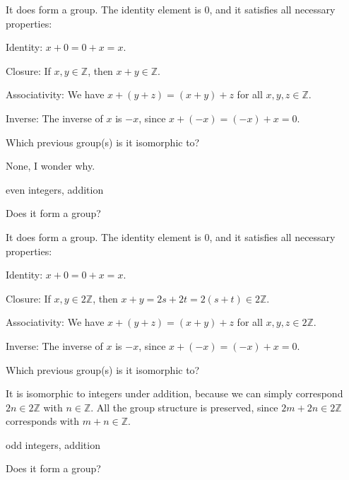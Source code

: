 \documentclass[../gatm_answers.tex]{subfiles}
\begin{document}
It does form a group. The identity element is $0$, and it satisfies all necessary properties:

Identity: $x+0=0+x=x$.

Closure: If $x,y\in \mathbb{Z}$, then $x+y\in\mathbb{Z}$.

Associativity: We have $x+(y+z)=(x+y)+z$ for all $x,y,z\in\mathbb{Z}$.

Inverse: The inverse of $x$ is $-x$, since $x+(-x)=(-x)+x=0$.

\begin{iinner_problem}
\item Which previous group(s) is it isomorphic to?
\end{iinner_problem}

None, I wonder why.

\begin{inner_problem}
\item even integers, addition
\end{inner_problem}

\begin{iinner_problem}[start=1]
\item Does it form a group?
\end{iinner_problem}

It does form a group. The identity element is $0$, and it satisfies all necessary properties:

Identity: $x+0=0+x=x$.

Closure: If $x,y\in 2\mathbb{Z}$, then $x+y=2s+2t=2(s+t)\in 2\mathbb{Z}$.

Associativity: We have $x+(y+z)=(x+y)+z$ for all $x,y,z \in 2\mathbb{Z}$.

Inverse: The inverse of $x$ is $-x$, since $x+(-x)=(-x)+x=0$.

\begin{iinner_problem}
\item Which previous group(s) is it isomorphic to?
\end{iinner_problem}

It is isomorphic to integers under addition, because we can simply correspond $2n\in 2\mathbb{Z}$ with $n\in\mathbb{Z}$. All the group structure is preserved, since $2m+2n\in 2\mathbb{Z}$ corresponds with $m+n\in\mathbb{Z}$.

\begin{inner_problem}
\item odd integers, addition
\end{inner_problem}

\begin{iinner_problem}[start=1]
\item Does it form a group?
\end{iinner_problem}
\end{document}
